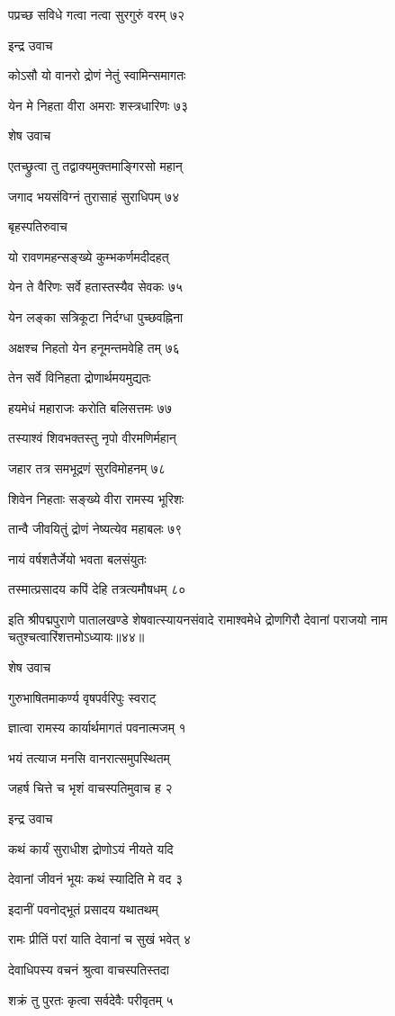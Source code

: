 पप्रच्छ सविधे गत्वा नत्वा सुरगुरुं वरम् ७२

इन्द्र उवाच

कोऽसौ यो वानरो द्रोणं नेतुं स्वामिन्समागतः

येन मे निहता वीरा अमराः शस्त्रधारिणः ७३

शेष उवाच

एतच्छ्रुत्वा तु तद्वाक्यमुक्तमाङ्गिरसो महान्

जगाद भयसंविग्नं तुरासाहं सुराधिपम् ७४

बृहस्पतिरुवाच

यो रावणमहन्सङ्ख्ये कुम्भकर्णमदीदहत्

येन ते वैरिणः सर्वे हतास्तस्यैव सेवकः ७५

येन लङ्का सत्रिकूटा निर्दग्धा पुच्छवह्निना

अक्षश्च निहतो येन हनूमन्तमवेहि तम् ७६

तेन सर्वे विनिहता द्रोणार्थमयमुद्यतः

हयमेधं महाराजः करोति बलिसत्तमः ७७

तस्याश्वं शिवभक्तस्तु नृपो वीरमणिर्महान्

जहार तत्र समभूद्रणं सुरविमोहनम् ७८

शिवेन निहताः सङ्ख्ये वीरा रामस्य भूरिशः

तान्वै जीवयितुं द्रोणं नेष्यत्येव महाबलः ७९

नायं वर्षशतैर्जेयो भवता बलसंयुतः

तस्मात्प्रसादय कपिं देहि तत्रत्यमौषधम् ८०

इति श्रीपद्मपुराणे पातालखण्डे शेषवात्स्यायनसंवादे रामाश्वमेधे द्रोणगिरौ देवानां पराजयो नाम चतुश्चत्वारिंशत्तमोऽध्यायः॥४४॥


शेष उवाच

गुरुभाषितमाकर्ण्य वृषपर्वरिपुः स्वराट्

ज्ञात्वा रामस्य कार्यार्थमागतं पवनात्मजम् १

भयं तत्याज मनसि वानरात्समुपस्थितम्

जहर्ष चित्ते च भृशं वाचस्पतिमुवाच ह २

इन्द्र उवाच

कथं कार्यं सुराधीश द्रोणोऽयं नीयते यदि

देवानां जीवनं भूयः कथं स्यादिति मे वद ३

इदानीं पवनोद्भूतं प्रसादय यथातथम्

रामः प्रीतिं परां याति देवानां च सुखं भवेत् ४

देवाधिपस्य वचनं श्रुत्वा वाचस्पतिस्तदा

शक्रं तु पुरतः कृत्वा सर्वदेवैः परीवृतम् ५

